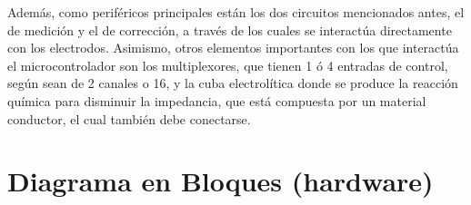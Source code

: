 Además, como periféricos principales están los dos circuitos mencionados antes, el de medición y el de corrección, a través de los cuales se interactúa directamente con los electrodos. Asimismo, otros elementos importantes con los que interactúa el microcontrolador son los multiplexores, que tienen 1 ó 4 entradas de control, según sean de 2 canales o 16, y la cuba electrolítica donde se produce la reacción química para disminuir la impedancia, que está compuesta por un material conductor, el cual también debe conectarse.



\section{Diagrama en Bloques (hardware)}



